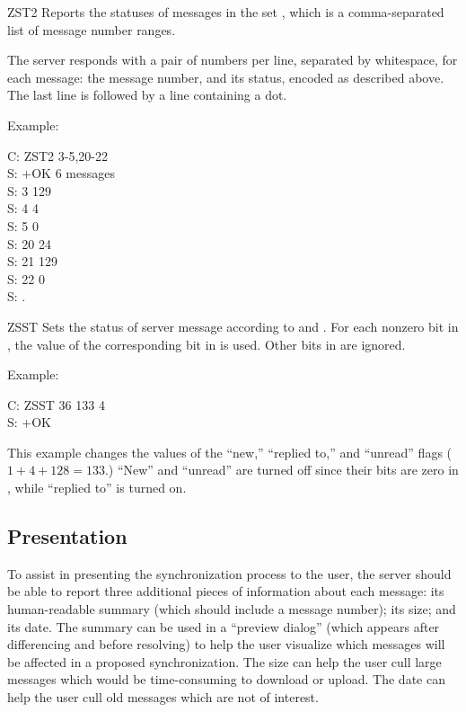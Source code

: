 \begin{codelist}
\item[ZST2 \var{msgs}] Reports the statuses of messages in the set
, which is a comma-separated list of message number ranges.

The server responds with a pair of numbers per line, separated by
whitespace, for each message: the message number, and its status,
encoded as described above.  The last line is followed by a line
containing a dot.

Example:

\begin{conversation}
C: ZST2 3-5,20-22 \\
S: +OK 6 messages \\
S: 3 129 \\
S: 4 4 \\
S: 5 0 \\
S: 20 24 \\
S: 21 129 \\
S: 22 0 \\
S: .
\end{conversation}

\item[ZSST \var{msg} \var{mask} \var{val}] Sets the status of server
message  according to  and .  For each
nonzero bit in , the value of the corresponding bit in
 is used.  Other bits in  are ignored.

Example:

\begin{conversation}
C: ZSST 36 133 4 \\
S: +OK
\end{conversation}

This example changes the values of the ``new,'' ``replied to,'' and
``unread'' flags ($1+4+128=133$.)  ``New'' and ``unread'' are turned
off since their bits are zero in , while ``replied to'' is
turned on.
\end{codelist}

\subsection{Presentation}

To assist in presenting the synchronization process to the user, the
server should be able to report three additional pieces of information
about each message: its human-readable summary (which should include a
message number); its size; and its date.  The summary can be used in a
``preview dialog'' (which appears after differencing and before
resolving) to help the user visualize which messages will be affected
in a proposed synchronization.  The size can help the user cull large
messages which would be time-consuming to download or upload.  The
date can help the user cull old messages which are not of interest.

